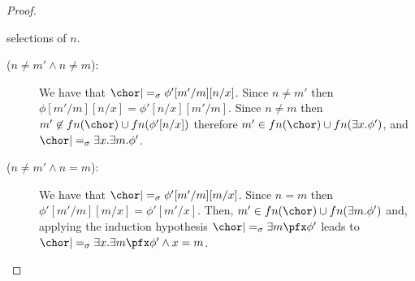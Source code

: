 \begin{proof}
\begin{description}
\begin{description}
              selections of $n$.
              \begin{description}
                \item[($n\neq m' \land n\neq m$):] We have that $\chor
                  |=_\sigma \phi' [m'/m][n/x]$. Since $n\neq m'$ then
                  $\phi[m'/m][n/x] = \phi' [n/x][m'/m]$. Since $n\neq
                  m$ then $m' \not \in fn(\chor) \cup fn(\phi'[n/x])$
                  therefore $m' \in fn(\chor) \cup fn(\exists x. \phi' )$,
                  and  $\chor |=_\sigma \exists x. \exists m .
                  \phi'$.
                  \item[($n\neq m' \land n=m$):] We have that $\chor
                    |=_\sigma \phi'[m'/m][m/x]$. Since $n =m$ then
                    $\phi'[m'/m][m/x] = \phi'[m'/x]$. Then, $m' \in
                    fn(\chor) \cup fn(\exists m. \phi')$  and,
                    applying the induction hypothesis $\chor |=_\sigma \exists
                    m \pfx \phi'$ leads to  $\chor |=_\sigma \exists x. \exists m
                    \pfx \phi' \land x = m$.
                \end{description}
          \end{description}
   \end{description}
\end{proof}

